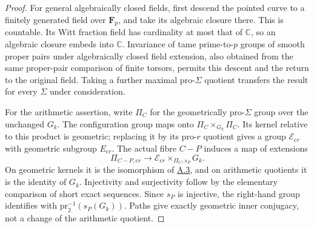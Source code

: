 \documentclass[11pt,a4paper]{article}
\newcommand{\F}{\mathbf F}
\newcommand{\pr}{\mathrm{pr}}
\newcommand{\crr}{\mathrm{c}r}
\newcommand{\statementref}[1]{\hyperlink{#1}{#1}}
\begin{document}
\begin{proof}
For general algebraically closed fields, first descend the pointed
curve to a finitely generated field over $\F_p$, and take its
algebraic closure there. This is countable. Its Witt fraction field has
cardinality at most that of $\mathbb C$, so an algebraic closure
embeds into $\mathbb C$. Invariance of tame prime-to-$p$ groups of
smooth proper pairs under algebraically closed field extension, also
obtained from the same proper-pair comparison of finite torsors,
permits this descent and the return to the original field. Taking a
further maximal pro-$\Sigma$ quotient transfers the result for every
$\Sigma$ under consideration.

For the arithmetic assertion, write $\Pi_C$ for the geometrically
pro-$\Sigma$ group over the unchanged $G_k$. The configuration group
maps onto $\Pi_C\times_{G_k}\Pi_C$. Its kernel relative to this
product is geometric; replacing it by its pro-$r$ quotient gives a
group $\mathcal E_{\crr}$ with geometric subgroup $E_{\crr}$.
The actual fibre $C-P$ induces a map of extensions
\[
 \Pi_{C-P,\crr}\longrightarrow
 \mathcal E_{\crr}\times_{\Pi_C,s_P}G_k.
\]
On geometric kernels it is the isomorphism of
\statementref{A.3}, and on arithmetic quotients it is the identity
of $G_k$. Injectivity and surjectivity follow by the elementary
comparison of short exact sequences. Since $s_P$ is injective, the
right-hand group identifies with $\pr_2^{-1}(s_P(G_k))$.
Paths give exactly geometric inner conjugacy, not a change of the
arithmetic quotient.
\end{proof}
\end{document}
